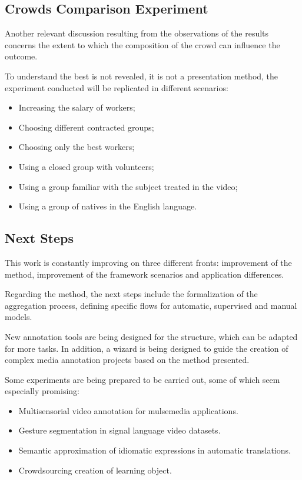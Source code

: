 \subsection{Crowds Comparison Experiment}
Another relevant discussion resulting from the observations of the results concerns the extent to which the composition of the crowd can influence the outcome.

To understand the best is not revealed, it is not a presentation method, the experiment conducted will be replicated in different scenarios:
\begin{itemize}
\item Increasing the salary of workers;
\item Choosing different contracted groups;
\item Choosing only the best workers;
\item Using a closed group with volunteers;
\item Using a group familiar with the subject treated in the video;
\item Using a group of natives in the English language.
\end{itemize}


\subsection{Next Steps}

This work is constantly improving on three different fronts: improvement of the method, improvement of the framework scenarios and application differences.

Regarding the method, the next steps include the formalization of the aggregation process, defining specific flows for automatic, supervised and manual models.

New annotation tools are being designed for the structure, which can be adapted for more tasks. In addition, a wizard is being designed to guide the creation of complex media annotation projects based on the method presented.

Some experiments are being prepared to be carried out, some of which seem especially promising:
\begin{itemize}
\item Multisensorial video annotation for mulsemedia applications.
\item Gesture segmentation in signal language video datasets.
\item Semantic approximation of idiomatic expressions in automatic translations.
\item Crowdsourcing  creation of learning object.
\end{itemize}
